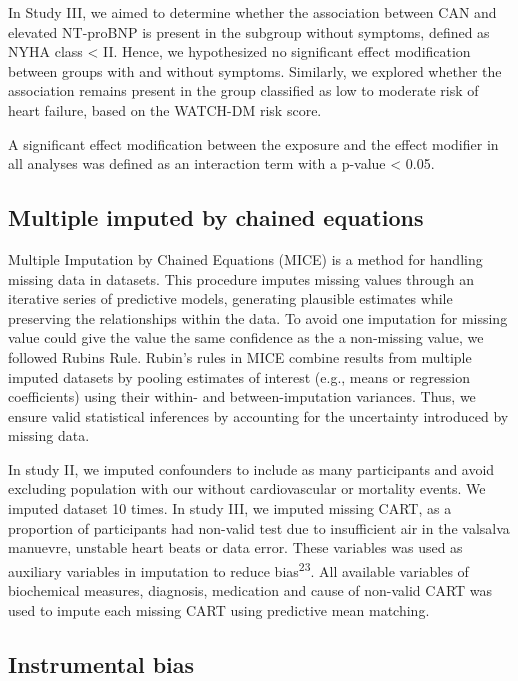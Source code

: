 \documentclass[
  a4paper,
  headsepline=true,
  open=any]{scrbook}
\begin{document}
In Study III, we aimed to determine whether the association between CAN
and elevated NT-proBNP is present in the subgroup without symptoms,
defined as NYHA class \textless{} II. Hence, we hypothesized no
significant effect modification between groups with and without
symptoms. Similarly, we explored whether the association remains present
in the group classified as low to moderate risk of heart failure, based
on the WATCH-DM risk score.

A significant effect modification between the exposure and the effect
modifier in all analyses was defined as an interaction term with a
p-value \textless{} 0.05.

\hypertarget{multiple-imputed-by-chained-equations}{%
\subsection{Multiple imputed by chained
equations}\label{multiple-imputed-by-chained-equations}}

Multiple Imputation by Chained Equations (MICE) is a method for handling
missing data in datasets. This procedure imputes missing values through
an iterative series of predictive models, generating plausible estimates
while preserving the relationships within the data. To avoid one
imputation for missing value could give the value the same confidence as
the a non-missing value, we followed Rubins Rule. Rubin's rules in MICE
combine results from multiple imputed datasets by pooling estimates of
interest (e.g., means or regression coefficients) using their within-
and between-imputation variances. Thus, we ensure valid statistical
inferences by accounting for the uncertainty introduced by missing data.

In study II, we imputed confounders to include as many participants and
avoid excluding population with our without cardiovascular or mortality
events. We imputed dataset 10 times. In study III, we imputed missing
CART, as a proportion of participants had non-valid test due to
insufficient air in the valsalva manuevre, unstable heart beats or data
error. These variables was used as auxiliary variables in imputation to
reduce bias\textsuperscript{23}. All available variables of biochemical
measures, diagnosis, medication and cause of non-valid CART was used to
impute each missing CART using predictive mean matching.

\hypertarget{instrumental-bias}{%
\subsection{Instrumental bias}\label{instrumental-bias}}
\end{document}
